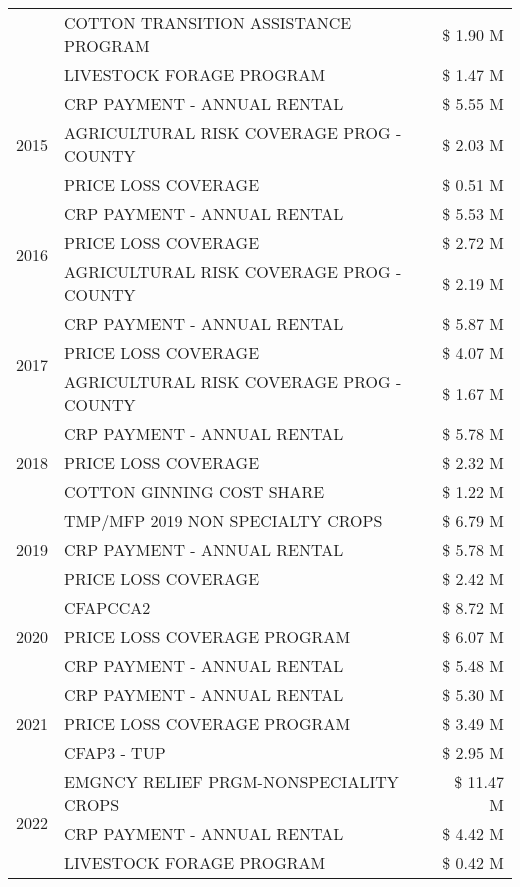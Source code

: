 \begin{tabular}{llr}
 & COTTON TRANSITION ASSISTANCE PROGRAM & \$ 1.90 M \\
 & LIVESTOCK FORAGE PROGRAM & \$ 1.47 M \\
\cline{1-3}
\multirow[t]{3}{*}{2015} & CRP PAYMENT - ANNUAL RENTAL & \$ 5.55 M \\
 & AGRICULTURAL RISK COVERAGE PROG - COUNTY & \$ 2.03 M \\
 & PRICE LOSS COVERAGE & \$ 0.51 M \\
\cline{1-3}
\multirow[t]{3}{*}{2016} & CRP PAYMENT - ANNUAL RENTAL & \$ 5.53 M \\
 & PRICE LOSS COVERAGE & \$ 2.72 M \\
 & AGRICULTURAL RISK COVERAGE PROG - COUNTY & \$ 2.19 M \\
\cline{1-3}
\multirow[t]{3}{*}{2017} & CRP PAYMENT - ANNUAL RENTAL & \$ 5.87 M \\
 & PRICE LOSS COVERAGE & \$ 4.07 M \\
 & AGRICULTURAL RISK COVERAGE PROG - COUNTY & \$ 1.67 M \\
\cline{1-3}
\multirow[t]{3}{*}{2018} & CRP PAYMENT - ANNUAL RENTAL & \$ 5.78 M \\
 & PRICE LOSS COVERAGE & \$ 2.32 M \\
 & COTTON GINNING COST SHARE & \$ 1.22 M \\
\cline{1-3}
\multirow[t]{3}{*}{2019} & TMP/MFP 2019 NON SPECIALTY CROPS & \$ 6.79 M \\
 & CRP PAYMENT - ANNUAL RENTAL & \$ 5.78 M \\
 & PRICE LOSS COVERAGE & \$ 2.42 M \\
\cline{1-3}
\multirow[t]{3}{*}{2020} & CFAPCCA2 & \$ 8.72 M \\
 & PRICE LOSS COVERAGE PROGRAM & \$ 6.07 M \\
 & CRP PAYMENT - ANNUAL RENTAL & \$ 5.48 M \\
\cline{1-3}
\multirow[t]{3}{*}{2021} & CRP PAYMENT - ANNUAL RENTAL & \$ 5.30 M \\
 & PRICE LOSS COVERAGE PROGRAM & \$ 3.49 M \\
 & CFAP3 - TUP & \$ 2.95 M \\
\cline{1-3}
\multirow[t]{3}{*}{2022} & EMGNCY RELIEF PRGM-NONSPECIALITY CROPS & \$ 11.47 M \\
 & CRP PAYMENT - ANNUAL RENTAL & \$ 4.42 M \\
 & LIVESTOCK FORAGE PROGRAM & \$ 0.42 M \\
\cline{1-3}
\bottomrule
\end{tabular}
